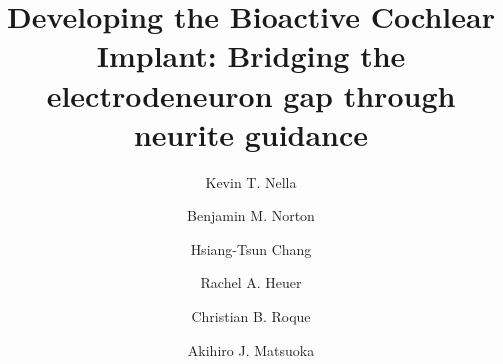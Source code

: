 \documentclass[review]{elsarticle}
\begin{document}
\begin{frontmatter}
\title{Developing the Bioactive Cochlear Implant: Bridging the electrode\textendash neuron gap through neurite guidance}



\author[ENT,ME]{Kevin T. Nella}

\author[ENT]{Benjamin M. Norton}

\author[ENT]{Hsiang-Tsun Chang}

\author[ENT]{Rachel A. Heuer}

\author[ENT]{Christian B. Roque}

\author[ENT,SQI,CSD,KNOWLES]{Akihiro J. Matsuoka}

\address[ENT]{Department of Otolaryngology\textendash Head and Neck Surgery, Feinberg School of Medicine, Northwestern University, Chicago IL, 60611, USA}

\address[ME]{Department of Mechanical Engineering, Robert R. McCormick School of Engineering and Applied Science, Northwestern University, Evanston IL., 60208, USA }

\address[SQI]{Simpson Querrey Institute, Chicago IL, 60611, USA}

\address[CSD]{Roxelyn and Richard Pepper Department of Communication Sciences and Disorders, School of Communication, Northwestern University, Evanston, IL., 60201, USA}

\address[KNOWLES] {The Hugh Knowles Center for Clinical and Basic Science in Hearing and its Disorders, Evanston, IL. 60201, USA}


\end{frontmatter}
\end{document}
